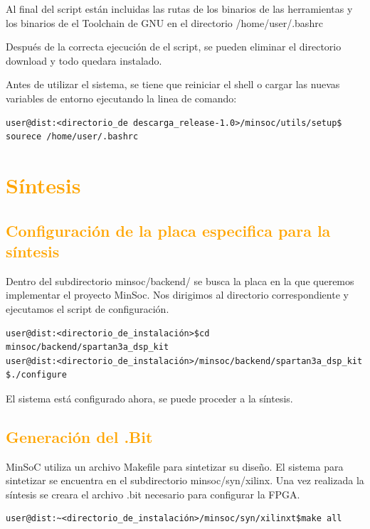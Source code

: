 Al final del script están incluidas las rutas de los binarios de las herramientas y los  binarios de el Toolchain de GNU en el directorio /home/user/.bashrc
 
Después de la correcta ejecución de el script, se pueden eliminar el directorio download y todo quedara instalado.

Antes de utilizar el sistema, se tiene que reiniciar el shell o cargar las nuevas variables de entorno ejecutando la linea de comando:

\begin{lstlisting}[breaklines]
user@dist:<directorio_de descarga_release-1.0>/minsoc/utils/setup$ sourece /home/user/.bashrc
\end{lstlisting}

\section{\textcolor{orange}{Síntesis}}

\subsection{\textcolor{orange}{Configuración de la placa especifica para la síntesis}}
Dentro del subdirectorio minsoc/backend/ se busca la placa en la que queremos implementar el proyecto MinSoc. Nos dirigimos al directorio correspondiente y ejecutamos el script de configuración.

\begin{lstlisting}[breaklines]
user@dist:<directorio_de_instalación>$cd minsoc/backend/spartan3a_dsp_kit 
user@dist:<directorio_de_instalación>/minsoc/backend/spartan3a_dsp_kit $./configure 
\end{lstlisting}

El sistema está configurado ahora, se puede proceder a la síntesis.

\subsection{\textcolor{orange}{Generación del .Bit}}

MinSoC utiliza un archivo Makefile para sintetizar su diseño. El sistema para sintetizar se encuentra en el subdirectorio minsoc/syn/xilinx. Una vez realizada la síntesis se creara el archivo .bit necesario para configurar la FPGA.

\begin{lstlisting}[breaklines]
user@dist:~<directorio_de_instalación>/minsoc/syn/xilinxt$make all
\end{lstlisting}

